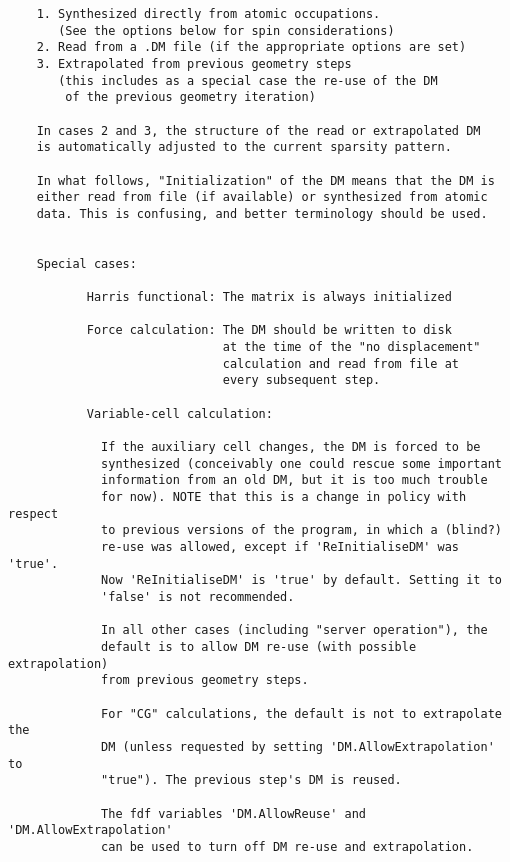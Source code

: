 \begin{verbatim}
    1. Synthesized directly from atomic occupations.
       (See the options below for spin considerations)
    2. Read from a .DM file (if the appropriate options are set)
    3. Extrapolated from previous geometry steps
       (this includes as a special case the re-use of the DM 
        of the previous geometry iteration)

    In cases 2 and 3, the structure of the read or extrapolated DM
    is automatically adjusted to the current sparsity pattern.

    In what follows, "Initialization" of the DM means that the DM is
    either read from file (if available) or synthesized from atomic
    data. This is confusing, and better terminology should be used.


    Special cases:

           Harris functional: The matrix is always initialized

           Force calculation: The DM should be written to disk
                              at the time of the "no displacement"
                              calculation and read from file at
                              every subsequent step.

           Variable-cell calculation:
   
             If the auxiliary cell changes, the DM is forced to be
             synthesized (conceivably one could rescue some important
             information from an old DM, but it is too much trouble
             for now). NOTE that this is a change in policy with respect
             to previous versions of the program, in which a (blind?)
             re-use was allowed, except if 'ReInitialiseDM' was 'true'.
             Now 'ReInitialiseDM' is 'true' by default. Setting it to
             'false' is not recommended.

             In all other cases (including "server operation"), the
             default is to allow DM re-use (with possible extrapolation)
             from previous geometry steps.

             For "CG" calculations, the default is not to extrapolate the
             DM (unless requested by setting 'DM.AllowExtrapolation' to
             "true"). The previous step's DM is reused.

             The fdf variables 'DM.AllowReuse' and 'DM.AllowExtrapolation'
             can be used to turn off DM re-use and extrapolation.

\end{verbatim}


